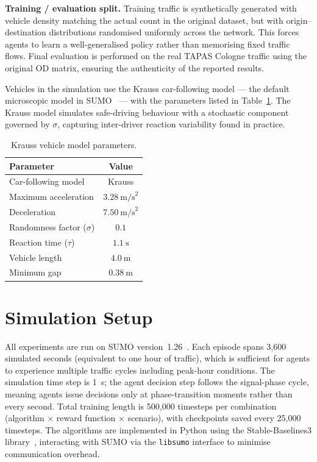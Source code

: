 \noindent\textbf{Training / evaluation split.}\;
Training traffic is synthetically generated with vehicle density matching the
actual count in the original dataset, but with origin–destination
distributions randomised uniformly across the network. This forces agents to
learn a well-generalised policy rather than memorising fixed traffic flows.
Final evaluation is performed on the real TAPAS Cologne traffic using the
original OD matrix, ensuring the authenticity of the reported results.

Vehicles in the simulation use the Krauss car-following model — the default
microscopic model in SUMO~\cite{lopez2018sumo} — with the parameters listed in
Table~\ref{tab:krauss}. The Krauss model simulates safe-driving behaviour with
a stochastic component governed by $\sigma$, capturing inter-driver reaction
variability found in practice.

\begin{table}[htbp]
    \caption{Krauss vehicle model parameters.}
    \label{tab:krauss}
    \centering
    \begin{tabular}{lc}
        \toprule
        \textbf{Parameter} & \textbf{Value} \\
        \midrule
        Car-following model         & Krauss \\
        Maximum acceleration        & $3.28\ \text{m/s}^2$ \\
        Deceleration                & $7.50\ \text{m/s}^2$ \\
        Randomness factor ($\sigma$)& $0.1$ \\
        Reaction time ($\tau$)      & $1.1\ \text{s}$ \\
        Vehicle length              & $4.0\ \text{m}$ \\
        Minimum gap                 & $0.38\ \text{m}$ \\
        \bottomrule
    \end{tabular}
\end{table}

\section{Simulation Setup}

All experiments are run on SUMO version~1.26~\cite{lopez2018sumo}. Each episode
spans 3{,}600 simulated seconds (equivalent to one hour of traffic), which is
sufficient for agents to experience multiple traffic cycles including peak-hour
conditions. The simulation time step is 1~s; the agent decision step follows
the signal-phase cycle, meaning agents issue decisions only at phase-transition
moments rather than every second. Total training length is 500{,}000 timesteps
per combination (algorithm $\times$ reward function $\times$ scenario), with
checkpoints saved every 25{,}000 timesteps. The algorithms are implemented in
Python using the Stable-Baselines3 library~\cite{stable_baselines3}, interacting
with SUMO via the \texttt{libsumo} interface to minimise communication overhead.


